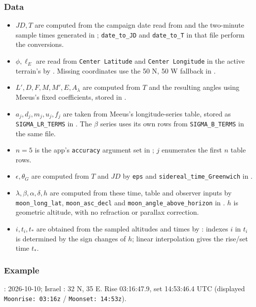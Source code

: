 \documentclass[10pt,a4paper]{amsart}
\begin{document}
\subsubsection*{Data}
\begin{itemize}
\setlength{\itemsep}{0pt}
\setlength{\parsep}{0pt}
\item $JD,T$ are computed from the campaign date read from
 and the two-minute sample times generated in
; \texttt{date\_to\_JD} and
\texttt{date\_to\_T} in that file perform the conversions.
\item $\phi,\ell_E$ are read from \texttt{Center Latitude} and
\texttt{Center Longitude} in the active terrain's 
by . Missing coordinates use the
50 N, 50 W fallback in .
\item $L',D,F,M,M',E,A_\lambda$ are computed from $T$ and the resulting
angles using Meeus's fixed coefficients, stored in
.
\item $a_j,d_j,m_j,u_j,f_j$ are taken from Meeus's longitude-series
table, stored as \texttt{SIGMA\_LR\_TERMS} in .
The $\beta$ series uses its own rows from \texttt{SIGMA\_B\_TERMS}
in the same file.
\item $n=5$ is the app's \texttt{accuracy} argument set in
; $j$ enumerates the first $n$ table rows.
\item $\epsilon,\theta_G$ are computed from $T$ and $JD$ by
\texttt{eps} and \texttt{sidereal\_time\_Greenwich} in .
\item $\lambda,\beta,\alpha,\delta,h$ are computed from these time,
table and observer inputs by \texttt{moon\_long\_lat},
\texttt{moon\_asc\_decl} and \texttt{moon\_angle\_above\_horizon} in
. $h$ is geometric altitude, with no refraction or
parallax correction.
\item $i,t_i,t_*$ are obtained from the sampled altitudes and times by
: indexes $i$ in $t_i$ is determined by the sign changes of $h$;
linear interpolation gives the rise/set time $t_*$.
\end{itemize}

\subsubsection*{Example}
: 2026-10-10;
Israel : 32 N, 35 E. Rise 03:16:47.9, set 14:53:46.4 UTC
(displayed \texttt{Moonrise: 03:16z} / \texttt{Moonset: 14:53z}).
\end{document}
